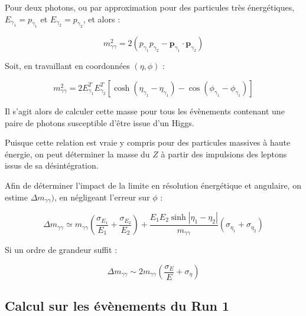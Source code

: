 \documentclass[11pt]{article} %
\begin{document}
Pour deux photons,  ou par approximation pour des particules très énergétiques, $E_{\gamma_1} = p_{\gamma_1}$ et $E_{\gamma_2} = p_{\gamma_2}$, et alors :

\begin{equation}
m_{\gamma \gamma}^2 = 2 \left ( p_{\gamma_1} p_{\gamma_2} - \textbf{p}_{\gamma_1} \cdot \textbf{p}_{\gamma_2} \right )
\end{equation}

Soit, en travaillant en coordonnées $(\eta, \phi)$ :

\begin{equation}
m_{\gamma \gamma}^2 = 2 E_{\gamma_1}^T E_{\gamma_2}^T \left [ \cosh {\left( \eta_{\gamma_1} - \eta_{\gamma_1} \right)} - \cos{\left( \phi_{\gamma_1} - \phi_{\gamma_1} \right)} \right ]
\end{equation}

Il s'agit alors de calculer cette masse pour tous les évènements contenant une paire de photons susceptible d'être issue d'un Higgs. 

Puisque cette relation est vraie y compris pour des particules massives à haute énergie, on peut déterminer la masse du $Z$ à partir des impulsions des leptons issus de sa désintégration.

Afin  de déterminer l'impact de la limite en résolution énergétique et angulaire, on estime $\Delta m_{\gamma\gamma})$, en négligeant l'erreur sur $\phi$ :

\begin{equation}
\Delta m_{\gamma\gamma} \simeq m_{\gamma \gamma}\left( \dfrac{\sigma_{E_1}}{E_1} +  \dfrac{\sigma_{E_2}}{E_2}\right) + \dfrac{E_1E_2 \sinh {|\eta_1 - \eta_2|}}{m_{\gamma \gamma}} \left( \sigma_{\eta_1} + \sigma_{\eta_2} \right)
\end{equation}

Si un ordre de grandeur suffit :

\begin{equation}
\Delta m_{\gamma\gamma} \sim 2m_{\gamma \gamma}\left ( \dfrac{\sigma_E}{E} +  \sigma_{\eta} \right )
\end{equation}

\subsection{Calcul sur les évènements du Run 1}
\end{document}
